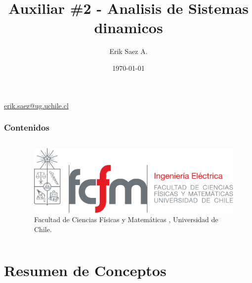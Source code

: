 \documentclass[
    10pt,
    aspectratio=169,
    xcolor={dvipsnames},
    spanish,
    ]{beamer}
\title[Auxiliar \#2 - Analisis de Sistemas dinamicos]{\bfseries Auxiliar \#2 - Analisis de Sistemas dinamicos}
\subtitle{}
\author[Erik Saez A.]{Erik Saez A.}
\institute[UChile]{Department of Electrical Engineering \\ Universidad de Chile}
\date{\today}
\begin{document}
\begin{frame}
  \titlepage
  \centering
   \href{mailto:erik.saez@ug.uchile.cl}{erik.saez@ug.uchile.cl} \hspace{.2cm}
\end{frame}

\begin{frame}
  \frametitle{Contenidos}
  \centering
  \begin{columns}
    \begin{column}{0.4\textwidth}
      \tableofcontents
    \end{column}
    \begin{column}{0.5\textwidth}
      \begin{figure}
        \centering
        \includegraphics[width=\textwidth]{fcfm_die}
        \caption{Facultad de Ciencias Físicas y Matemáticas , Universidad de Chile.}
      \end{figure}
    \end{column}
  \end{columns}  
\end{frame}

\section{Resumen de Conceptos}
\end{document}
